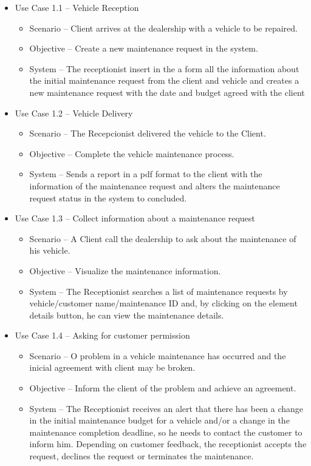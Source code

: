 \begin{itemize}
    \item Use Case 1.1 – Vehicle Reception
    \begin{itemize}
      \item Scenario – Client arrives at the dealership with a vehicle to be repaired.
      \item Objective – Create a new maintenance request in the system.
      \item System – The receptionist insert in the a form all the information about the initial maintenance request from the client and vehicle and creates a new maintenance request with the date and budget agreed with the client 
    \end{itemize}
    \item Use Case 1.2 – Vehicle Delivery 
    \begin{itemize}
      \item Scenario – The Recepcionist delivered the vehicle to the Client.
      \item Objective – Complete the vehicle maintenance process.
      \item System – Sends a report in a pdf format to the client with the information of the maintenance request and alters the maintenance request status in the system to concluded. 
    \end{itemize}
    \item Use Case 1.3 – Collect information about a maintenance request
    \begin{itemize}
      \item Scenario – A Client call the dealership to ask about the maintenance of his vehicle.
      \item Objective – Visualize the maintenance information.
      \item System –  The Receptionist searches a list of maintenance requests by vehicle/customer name/maintenance ID and, by clicking on the element details button, he can view the maintenance details.
    \end{itemize}
    \item Use Case 1.4 – Asking for customer permission
    \begin{itemize}
      \item Scenario – O problem in a vehicle maintenance has occurred and the inicial agreement with client may be broken.
      \item Objective – Inform the client of the problem and achieve an agreement.
      \item System – The Receptionist receives an alert that there has been a change in the initial maintenance budget for a vehicle and/or a change in the maintenance completion deadline, so he needs to contact the customer to inform him. Depending on customer feedback, the receptionist accepts the request, declines the request or terminates the maintenance.
    \end{itemize}
  \end{itemize}  
  \hfill \break


